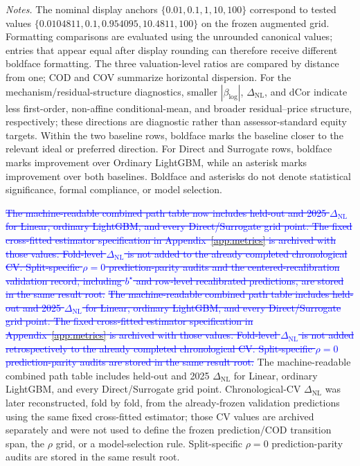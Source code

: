 \documentclass[10pt]{article}
\theoremstyle{definition}
\newcommand{\1}{\mathbf{1}}
\newcommand{\oldtext}[1]{\textcolor{blue}{\sout{#1}}}
\newcommand{\latesttext}[1]{\textcolor{latestPurple}{#1}}
\begin{document}
\begin{table}[!htbp]
\vspace{1mm}
\begin{minipage}{\textwidth}
\scriptsize
\emph{Notes.}
\latesttext{The nominal display anchors $\{0.01,0.1,1,10,100\}$ correspond to tested values $\{0.0104811,0.1,0.954095,10.4811,100\}$ on the frozen augmented grid.}
\latesttext{Formatting comparisons are evaluated using the unrounded canonical values; entries that appear equal after display rounding can therefore receive different boldface formatting.} The three valuation-level ratios are compared by distance from one; COD and COV summarize horizontal dispersion. For the mechanism/residual-structure diagnostics, smaller $|\beta_{\log}|$, $\Delta_{\mathrm{NL}}$, and dCor indicate less first-order, non-affine conditional-mean, and broader residual--price structure, respectively; these directions are diagnostic rather than assessor-standard equity targets. Within the two baseline rows, boldface marks the baseline closer to the relevant ideal or preferred direction. For Direct and Surrogate rows, boldface marks improvement over Ordinary LightGBM, while an asterisk marks improvement over both baselines. Boldface and asterisks do not denote statistical significance, formal compliance, or model selection.
\end{minipage}
\end{table}



\oldtext{The machine-readable combined path table now includes held-out and 2025 $\Delta_{\mathrm{NL}}$ for Linear, ordinary LightGBM, and every Direct/Surrogate grid point. The fixed cross-fitted estimator specification in Appendix~\ref{app:metrics} is archived with those values. Fold-level $\Delta_{\mathrm{NL}}$ is not added to the already completed chronological CV. Split-specific $\rho=0$ prediction-parity audits and the centered-recalibration validation record, including $b^\star$ and row-level recalibrated predictions, are stored in the same result root.}
\oldtext{The machine-readable combined path table includes held-out and 2025 $\Delta_{\mathrm{NL}}$ for Linear, ordinary LightGBM, and every Direct/Surrogate grid point. The fixed cross-fitted estimator specification in Appendix~\ref{app:metrics} is archived with those values. Fold-level $\Delta_{\mathrm{NL}}$ is not added retrospectively to the already completed chronological CV. Split-specific $\rho=0$ prediction-parity audits are stored in the same result root.}
\latesttext{The machine-readable combined path table includes held-out and 2025 $\Delta_{\mathrm{NL}}$ for Linear, ordinary LightGBM, and every Direct/Surrogate grid point. Chronological-CV $\Delta_{\mathrm{NL}}$ was later reconstructed, fold by fold, from the already-frozen validation predictions using the same fixed cross-fitted estimator; those CV values are archived separately and were not used to define the frozen prediction/COD transition span, the $\rho$ grid, or a model-selection rule. Split-specific $\rho=0$ prediction-parity audits are stored in the same result root.}
\end{document}
